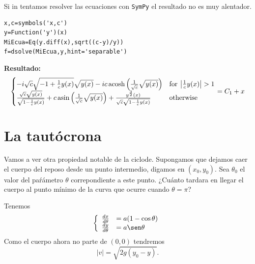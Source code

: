 \begin{subappendices}
Si in tentamos resolver las ecuaciones con \texttt{SymPy} el resultado no es muy alentador.
\begin{lstlisting}
x,c=symbols('x,c')
y=Function('y')(x)
MiEcua=Eq(y.diff(x),sqrt((c-y)/y))
f=dsolve(MiEcua,y,hint='separable')
\end{lstlisting}

\textbf{Resultado:}
\[
 \begin{cases} - i \sqrt{c} \sqrt{-1 + \frac{1}{c} y{\left (x \right )}} \sqrt{y{\left (x \right )}} - i c \operatorname{acosh}{\left (\frac{1}{\sqrt{c}} \sqrt{y{\left (x \right )}} \right )} & \text{for}\: \left\lvert{\frac{1}{c} y{\left (x \right )}}\right\rvert > 1 \\ \- \frac{\sqrt{c} \sqrt{y{\left (x \right )}}}{\sqrt{1 - \frac{1}{c} y{\left (x \right )}}} + c \operatorname{asin}{\left (\frac{1}{\sqrt{c}} \sqrt{y{\left (x \right )}} \right )} + \frac{y^{\frac{3}{2}}{\left (x \right )}}{\sqrt{c} \sqrt{1 - \frac{1}{c} y{\left (x \right )}}} & \text{otherwise} \end{cases} = C_{1} + x
\]



\section{La tautócrona}







  Vamos a ver otra propiedad notable de la ciclode. Supongamos que dejamos caer el cuerpo del reposo desde un punto intermedio, digamos en $(x_0,y_0)$. Sea  $\theta_0$
 el valor del paŕámetro $\theta$ correpondiente a este punto. ¿Cuánto tardara en llegar el cuerpo al punto mínimo de la curva que ocurre cuando $\theta=\pi$? 


  
  

 Tenemos
\[
 \left\{ \begin{array}{l l}
 \frac{dx}{d\theta}&=a(1-\cos\theta)\\
 \frac{dy}{d\theta}&=a\sen\theta 
 \end{array}\right.
\]
% 
Como el cuerpo ahora no parte de $(0,0)$ tendremos
\[|v|=\sqrt{2g(y_0-y)}.\]



\end{subappendices}
